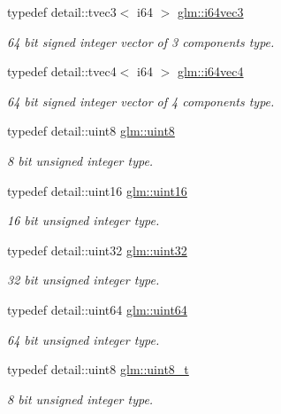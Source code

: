 \begin{DoxyCompactItemize}
typedef detail\-::tvec3$<$ i64 $>$ \hyperlink{group__gtc__type__precision_gaefca6f789bc2d5150fe594a9aa687840}{glm\-::i64vec3}
\begin{DoxyCompactList}\small\item\em 64 bit signed integer vector of 3 components type. \end{DoxyCompactList}\item 
typedef detail\-::tvec4$<$ i64 $>$ \hyperlink{group__gtc__type__precision_ga3f5fbc11fb153fa47a858e25ccf1ad27}{glm\-::i64vec4}
\begin{DoxyCompactList}\small\item\em 64 bit signed integer vector of 4 components type. \end{DoxyCompactList}\item 
typedef detail\-::uint8 \hyperlink{group__gtc__type__precision_ga1a7dcd8aac97cc8020817c94049deff2}{glm\-::uint8}
\begin{DoxyCompactList}\small\item\em 8 bit unsigned integer type. \end{DoxyCompactList}\item 
typedef detail\-::uint16 \hyperlink{group__gtc__type__precision_gad8c2939e1fdd8e5828b31d95c52255d5}{glm\-::uint16}
\begin{DoxyCompactList}\small\item\em 16 bit unsigned integer type. \end{DoxyCompactList}\item 
typedef detail\-::uint32 \hyperlink{group__gtc__type__precision_ga202b6a53c105fcb7e531f9b443518451}{glm\-::uint32}
\begin{DoxyCompactList}\small\item\em 32 bit unsigned integer type. \end{DoxyCompactList}\item 
typedef detail\-::uint64 \hyperlink{group__gtc__type__precision_gae3632bf9b37da66233d78930dd06378a}{glm\-::uint64}
\begin{DoxyCompactList}\small\item\em 64 bit unsigned integer type. \end{DoxyCompactList}\item 
typedef detail\-::uint8 \hyperlink{group__gtc__type__precision_ga93adf6dd9803408f3e3aaf9dedda352b}{glm\-::uint8\-\_\-t}
\begin{DoxyCompactList}\small\item\em 8 bit unsigned integer type. \end{DoxyCompactList}\item 

\end{DoxyCompactItemize}
